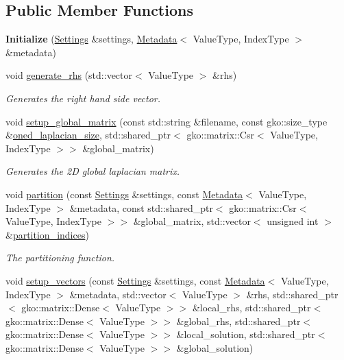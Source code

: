 \subsection*{Public Member Functions}
\begin{DoxyCompactItemize}
\item 
\mbox{\label{classschwz_1_1Initialize_a8ebf7bcf4c67d4ca6af0b5afba5a9a90}} 
{\bfseries Initialize} (\hyperlink{structschwz_1_1Settings}{Settings} \&settings, \hyperlink{structschwz_1_1Metadata}{Metadata}$<$ Value\+Type, Index\+Type $>$ \&metadata)
\item 
void \hyperlink{classschwz_1_1Initialize_a9dee6b55c599df30410cdf45819b3e28}{generate\+\_\+rhs} (std\+::vector$<$ Value\+Type $>$ \&rhs)
\begin{DoxyCompactList}\small\item\em Generates the right hand side vector. \end{DoxyCompactList}\item 
void \hyperlink{classschwz_1_1Initialize_af655816bbed181e0a243efa7e35e942f}{setup\+\_\+global\+\_\+matrix} (const std\+::string \&filename, const gko\+::size\+\_\+type \&\hyperlink{structschwz_1_1Metadata_a1333605c0573688ce4d71173f52ef2b4}{oned\+\_\+laplacian\+\_\+size}, std\+::shared\+\_\+ptr$<$ gko\+::matrix\+::\+Csr$<$ Value\+Type, Index\+Type $>$$>$ \&global\+\_\+matrix)
\begin{DoxyCompactList}\small\item\em Generates the 2D global laplacian matrix. \end{DoxyCompactList}\item 
void \hyperlink{classschwz_1_1Initialize_a23a10058e35a442c564c0748b66dcb08}{partition} (const \hyperlink{structschwz_1_1Settings}{Settings} \&settings, const \hyperlink{structschwz_1_1Metadata}{Metadata}$<$ Value\+Type, Index\+Type $>$ \&metadata, const std\+::shared\+\_\+ptr$<$ gko\+::matrix\+::\+Csr$<$ Value\+Type, Index\+Type $>$$>$ \&global\+\_\+matrix, std\+::vector$<$ unsigned int $>$ \&\hyperlink{classschwz_1_1Initialize_a007426e21221298b6dca9b7c9fbd1c10}{partition\+\_\+indices})
\begin{DoxyCompactList}\small\item\em The partitioning function. \end{DoxyCompactList}\item 
void \hyperlink{classschwz_1_1Initialize_a361211cdb821674a86b95d552591397c}{setup\+\_\+vectors} (const \hyperlink{structschwz_1_1Settings}{Settings} \&settings, const \hyperlink{structschwz_1_1Metadata}{Metadata}$<$ Value\+Type, Index\+Type $>$ \&metadata, std\+::vector$<$ Value\+Type $>$ \&rhs, std\+::shared\+\_\+ptr$<$ gko\+::matrix\+::\+Dense$<$ Value\+Type $>$$>$ \&local\+\_\+rhs, std\+::shared\+\_\+ptr$<$ gko\+::matrix\+::\+Dense$<$ Value\+Type $>$$>$ \&global\+\_\+rhs, std\+::shared\+\_\+ptr$<$ gko\+::matrix\+::\+Dense$<$ Value\+Type $>$$>$ \&local\+\_\+solution, std\+::shared\+\_\+ptr$<$ gko\+::matrix\+::\+Dense$<$ Value\+Type $>$$>$ \&global\+\_\+solution)

\end{DoxyCompactItemize}
